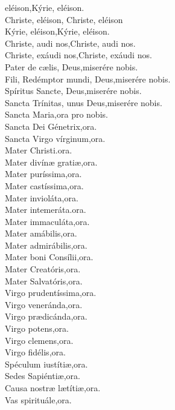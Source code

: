 eléison,\hfill Kýrie, eléison.\\
Christe, eléison, \hfill Christe, eléison\\
Kýrie, eléison,\hfill Kýrie, eléison.\\
Christe, audi nos,\hfill Christe, audi nos.\\
Christe, exáudi nos,\hfill Christe, exáudi nos.\\
Pater de c{\ae}lis, Deus,\hfill miserére nobis.\\
Fili, Redémptor mundi, Deus,\hfill miserére nobis.\\
Spíritus Sancte, Deus,\hfill miserére nobis.\\
Sancta Trínitas, unus Deus,\hfill miserére nobis.\\
Sancta Maria,\hfill ora pro nobis.\\
Sancta Dei Génetrix,\hfill ora.\\
Sancta Virgo vírginum,\hfill ora.\\
Mater Christi.\hfill ora.\\
Mater divín{\ae} grati{\ae},\hfill ora.\\
Mater puríssima,\hfill ora.\\
Mater castíssima,\hfill ora.\\
Mater invioláta,\hfill ora.\\
Mater intemeráta.\hfill ora.\\
Mater immaculáta,\hfill ora.\\
Mater amábilis,\hfill ora.\\
Mater admirábilis,\hfill ora.\\
Mater boni Consílii,\hfill ora.\\
Mater Creatóris,\hfill ora.\\
Mater Salvatóris,\hfill ora.\\
Virgo prudentíssima,\hfill ora.\\
Virgo veneránda,\hfill ora.\\
Virgo pr{\ae}dicánda,\hfill ora.\\
Virgo potens,\hfill ora.\\
Virgo clemens,\hfill ora.\\
Virgo fidélis,\hfill ora.\\
Spéculum iustíti{\ae},\hfill ora.\\
Sedes Sapiénti{\ae},\hfill ora.\\
Causa nostr{\ae} l{\ae}títi{\ae},\hfill ora.\\
Vas spirituále,\hfill ora.\\
